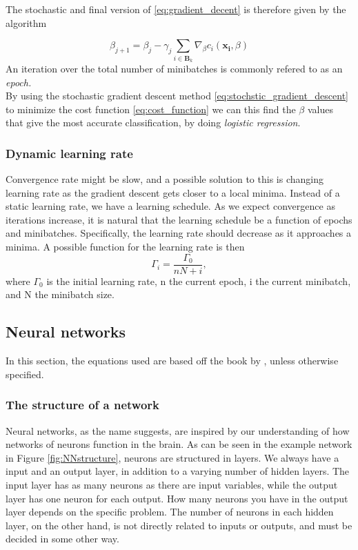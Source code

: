 The stochastic and final version of \eqref{eq:gradient_decent} is therefore given by the algorithm

\begin{equation}
    \beta_{j+1} = \beta_j - \gamma_j \sum_{i \in \boldsymbol{B}_k}\nabla_\beta c_i(\boldsymbol{x_i},\beta)
    \label{eq:stochstic_gradient_descent}
\end{equation}
An iteration over the total number of minibatches is commonly refered to as an \textit{epoch.}\\

By using the stochastic gradient descent method \eqref{eq:stochstic_gradient_descent} to minimize the cost function \eqref{eq:cost_function} we can this find the $\beta$ values that give the most accurate classification, by doing \textit{logistic regression}.

\subsubsection*{Dynamic learning rate}
Convergence rate might be slow, and a possible solution to this is changing learning rate as
the gradient descent gets closer to a local minima. Instead of a static learning rate, we have a learning schedule. As we expect convergence as iterations increase, it is natural that the learning schedule
be a function of epochs and minibatches. Specifically, the learning rate should decrease as it approaches a minima.
A possible function for the learning rate is then
  \begin{equation}
    \label{eq:learning_schedule}
    \Gamma_{i} = \frac{\Gamma_0}{nN+i},
  \end{equation}
where $\Gamma_{0}$ is the initial learning rate, n the current epoch, i the current minibatch,
and N the minibatch size.

\subsection{Neural networks}
In this section, the equations used are based off the book by \cite{Nielsen}, unless otherwise specified.
\subsubsection*{The structure of a network}
Neural networks, as the name suggests, are inspired by our understanding of how networks of neurons function in the brain. As can be seen in the example network in Figure \ref{fig:NNstructure}, neurons are structured in layers. We always have a input and an output layer, in addition to a varying number of hidden layers. The input layer has as many neurons as there are input variables, while the output layer has one neuron for each output. How many neurons you have in the output layer depends on the specific problem. The number of neurons in each hidden layer, on the other hand, is not directly related to inputs or outputs, and must be decided in some other way.

